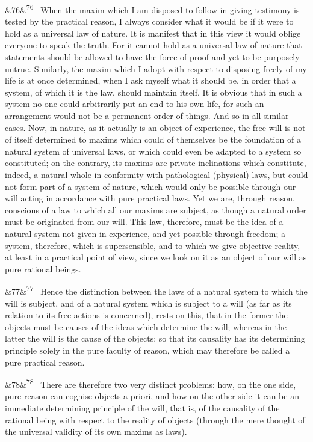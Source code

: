\documentclass[12pt]{article}
\newcommand{\para}[1][]{\par\noindent\ifx&#1&\else\textsuperscript{\footnotesize #1}~\fi}
\begin{document}
\para[76] When the maxim which I am disposed to follow in giving testimony is tested by the practical reason, I always consider what it would be if it were to hold as a universal law of nature. It is manifest that in this view it would oblige everyone to speak the truth. For it cannot hold as a universal law of nature that statements should be allowed to have the force of proof and yet to be purposely untrue. Similarly, the maxim which I adopt with respect to disposing freely of my life is at once determined, when I ask myself what it should be, in order that a system, of which it is the law, should maintain itself. It is obvious that in such a system no one could arbitrarily put an end to his own life, for such an arrangement would not be a permanent order of things. And so in all similar cases. Now, in nature, as it actually is an object of experience, the free will is not of itself determined to maxims which could of themselves be the foundation of a natural system of universal laws, or which could even be adapted to a system so constituted; on the contrary, its maxims are private inclinations which constitute, indeed, a natural whole in conformity with pathological (physical) laws, but could not form part of a system of nature, which would only be possible through our will acting in accordance with pure practical laws. Yet we are, through reason, conscious of a law to which all our maxims are subject, as though a natural order must be originated from our will. This law, therefore, must be the idea of a natural system not given in experience, and yet possible through freedom; a system, therefore, which is supersensible, and to which we give objective reality, at least in a practical point of view, since we look on it as an object of our will as pure rational beings.

\para[77] Hence the distinction between the laws of a natural system to which the will is subject, and of a natural system which is subject to a will (as far as its relation to its free actions is concerned), rests on this, that in the former the objects must be causes of the ideas which determine the will; whereas in the latter the will is the cause of the objects; so that its causality has its determining principle solely in the pure faculty of reason, which may therefore be called a pure practical reason.

\para[78] There are therefore two very distinct problems: how, on the one side, pure reason can cognise objects a priori, and how on the other side it can be an immediate determining principle of the will, that is, of the causality of the rational being with respect to the reality of objects (through the mere thought of the universal validity of its own maxims as laws).
\end{document}
